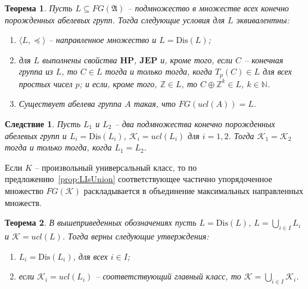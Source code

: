 \documentclass[12pt]{extarticle} %
\newtheorem{theorem}{Теорема}[section]
\newtheorem{corollary}{Следствие}[section]
\def\A{{\mathfrak{A}}}
\def\K{{\mathcal{K}}}
\def\Z{{\mathbb{Z}}}
\def\N{{\mathbb{N}}}
\def\HP{\textbf{HP}}
\def\JEP{\textbf{JEP}}
\def\Dis{{\mathrm{Dis}}}
\begin{document}
\begin{theorem}\label{th:MainClassAp}
Пусть $L \subseteq FG(\A)$ -- подмножество в множестве всех конечно порожденных абелевых групп. Тогда следующие условия для $L$ эквивалентны:
\begin{enumerate}
\item $\langle L, \preceq \rangle$ -- направленное множество и $L = \Dis(L)$;
\item для $L$ выполнены свойства $\HP$, $\JEP$ и, кроме того, если $C$ -- конечная группа из $L$, то $C \in L$ тогда и только тогда, когда $T_p(C) \in L$ для всех простых чисел $p$; и если, кроме того, $\Z \in L$, то $C \oplus \Z^k \in L$, $k \in \N$.
\item Существует абелева группа $A$ такая, что $FG(ucl(A)) = L$.
\end{enumerate}
\end{theorem}

\begin{corollary}
Пусть $L_1$ и $L_2$ -- два подмножества конечно порожденных абелевых групп и $L_i = \Dis(L_i)$, $\K_i = ucl(L_i)$ для $i = 1,2$. Тогда $\K_1 = \K_2$ тогда и только тогда, когда $L_1 = L_2$.
\end{corollary}

Если $K$ -- произвольный универсальный класс, то по предложению~\ref{prop:LIsUnion} соответствующее частично упорядоченное множество $FG(\K)$ раскладывается в объединение максимальных направленных множеств.

\begin{theorem}
В вышеприведенных обозначениях пусть $L = \Dis(L)$, $L = \bigcup\limits_{i \in I} L_i$ и $\K = ucl(L)$. Тогда верны следующие утверждения:
\begin{enumerate}
\item $L_i = \Dis(L_i)$, для всех $i \in I$;
\item если $\K_i = ucl(L_i)$ -- соответствующий главный класс, то $\K = \bigcup\limits_{i \in I} \K_i$.
\end{enumerate}
\end{theorem}
\end{document}
